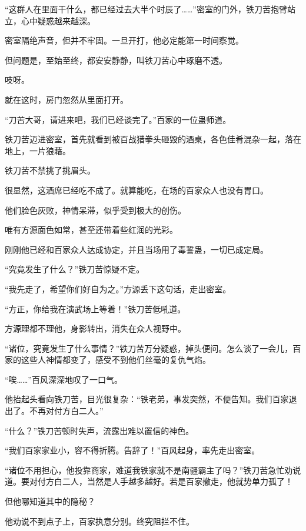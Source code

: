 
\begin{this_body}



“这群人在里面干什么，都已经过去大半个时辰了……”密室的门外，铁刀苦抱臂站立，心中疑惑越来越深。

密室隔绝声音，但并不牢固。一旦开打，他必定能第一时间察觉。

但问题是，至始至终，都安安静静，叫铁刀苦心中琢磨不透。

吱呀。

就在这时，房门忽然从里面打开。

“刀苦大哥，请进来吧，我们已经谈完了。”百家的一位蛊师道。

铁刀苦迈进密室，首先就看到被百战猎拳头砸毁的酒桌，各色佳肴混杂一起，落在地上，一片狼藉。

铁刀苦不禁挑了挑眉头。

很显然，这酒席已经吃不成了。就算能吃，在场的百家众人也没有胃口。

他们脸色灰败，神情呆滞，似乎受到极大的创伤。

唯有方源面色如常，甚至还带着些红润的光彩。

刚刚他已经和百家众人达成协定，并且当场用了毒誓蛊，一切已成定局。

“究竟发生了什么？”铁刀苦惊疑不定。

“我先走了，希望你们好自为之。”方源丢下这句话，走出密室。

“方正，你给我在演武场上等着！”铁刀苦低吼道。

方源理都不理他，身影转出，消失在众人视野中。

“诸位，究竟发生了什么事情？”铁刀苦万分疑惑，掉头便问。怎么谈了一会儿，百家的这些人神情都变了，感受不到他们丝毫的复仇气焰。

“唉……”百风深深地叹了一口气。

他抬起头看向铁刀苦，目光很复杂：“铁老弟，事发突然，不便告知。我们百家退出了。不再对付方白二人。”

“什么？”铁刀苦顿时失声，流露出难以置信的神色。

“我们百家家业小，容不得折腾。告辞了！”百风起身，率先走出密室。

“诸位不用担心，他投靠商家，难道我铁家就不是南疆霸主了吗？”铁刀苦急忙劝说道。要对付方白二人，当然是人手越多越好。若是百家撤走，他就势单力孤了！

但他哪知道其中的隐秘？

他劝说不到点子上，百家执意分别。终究阻拦不住。


\end{this_body}
